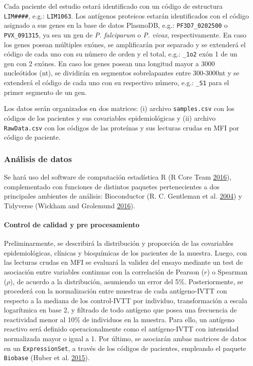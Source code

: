 \documentclass[a4paper]{article}
\let\oldparagraph\paragraph
\renewcommand{\paragraph}[1]{\oldparagraph{#1}\mbox{}}
\begin{document}
Cada paciente del estudio estará identificado con un código de
estructura \texttt{LIM\#\#\#\#}, e.g.: \texttt{LIM1063}. Los antígenos
proteicos estarán identificados con el código asignado a sus genes en la
base de datos PlasmoDB, e.g.: \texttt{PF3D7\_0202500} o
\texttt{PVX\_091315}, ya sea un gen de \emph{P. falciparum} o \emph{P.
vivax}, respectivamente. En caso los genes posean múltiples exónes, se
amplificarán por separado y se extenderá el código de cada uno con su
número de orden y el total, e.g.: \texttt{\_1o2} exón 1 de un gen con 2
exónes. En caso los genes posean una longitud mayor a 3000 nucleótidos
(nt), se dividirán en segmentos sobrelapantes entre 300-3000nt y se
extenderá el código de cada uno con su respectivo número, e.g.:
\texttt{\_S1} para el primer segmento de un gen.

Los datos serán organizados en dos matrices: (i) archivo
\texttt{samples.csv} con los códigos de los pacientes y sus covariables
epidemiológicas y (ii) archivo \texttt{RawData.csv} con los códigos de
las proteínas y sus lecturas crudas en MFI por código de paciente.

\hypertarget{anadata}{\subsubsection{Análisis de datos}\label{anadata}}

Se hará uso del software de computación estadística R (R Core Team
\protect\hyperlink{ref-R2016}{2016}), complementado con funciones de
distintos paquetes pertenecientes a dos principales ambientes de
análisis: Bioconductor (R. C. Gentleman et al.
\protect\hyperlink{ref-bioconductor2004}{2004}) y Tidyverse (Wickham and
Grolemund \protect\hyperlink{ref-wickham2016r4ds}{2016}).

\paragraph{Control de calidad y pre
procesamiento}\label{control-de-calidad-y-pre-procesamiento}

Preliminarmente, se describirá la distribución y proporción de las
covariables epidemiológicas, clínicas y bioquímicas de los pacientes de
la muestra. Luego, con las lecturas crudas en MFI se evaluará la validez
del ensayo mediante un test de asociación entre variables continuas con
la correlación de Pearson (\(r\)) o Spearman (\(\rho\)), de acuerdo a la
distribución, asumiendo un error del 5\%. Posteriormente, se procederá
con la normalización entre muestras de cada antígeno-IVTT con respecto a
la mediana de los control-IVTT por individuo, transformación a escala
logarítmica en base 2, y filtrado de todo antígeno que posea una
frecuencia de reactividad menor al 10\% de individuos en la muestra.
Para ello, un antígeno reactivo será definido operacionalmente como el
antígeno-IVTT con intensidad normalizada mayor o igual a 1. Por último,
se asociarán ambas matrices de datos en un \texttt{ExpressionSet}, a
través de los códigos de pacientes, empleando el paquete
\texttt{Biobase} (Huber et al. \protect\hyperlink{ref-Biobase}{2015}).
\end{document}
